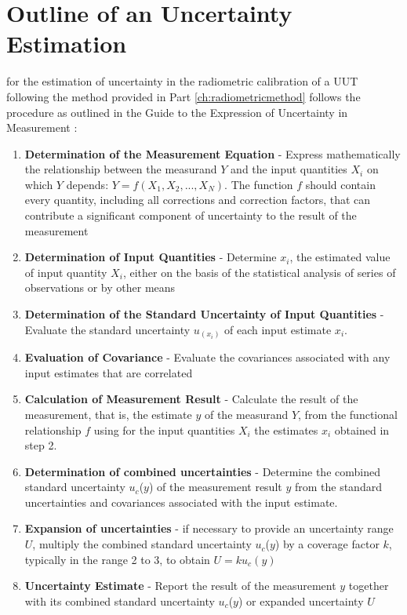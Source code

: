 \documentclass[nohyper,nobib]{tufte-book}
\begin{document}
\chapter{Outline of an Uncertainty Estimation}
\label{ch:outlineuncertain}

 for the estimation of uncertainty in the radiometric calibration of a UUT following the method provided in Part \ref{ch:radiometricmethod}  follows the procedure as outlined in the Guide to the Expression of Uncertainty in Measurement \cite{GUM2008}:

\begin{enumerate}
	\item \textbf{Determination of the Measurement Equation} - Express mathematically the relationship between the measurand $Y$ and the input quantities $X_{i}$ on which $Y$ depends: \( Y = f (X_{1}, X_{2}, ..., X_{N}) \). The function $f$ should contain every quantity, including all corrections and correction factors, that can contribute a significant component of uncertainty to the result of the
measurement 
	\item \textbf{Determination of Input Quantities} - Determine $x_{i}$, the estimated value of input quantity $X_{i}$, either on the basis of the statistical analysis of series of observations or by other means
	\item  \textbf{Determination of the Standard Uncertainty of Input Quantities} - Evaluate the standard uncertainty $u_{(x_{i})}$ of each input estimate $x_{i}$.
	\item \textbf{Evaluation of Covariance} - Evaluate the covariances associated with any input estimates that are correlated
	\item \textbf{Calculation of Measurement Result} - Calculate the result of the measurement, that is, the estimate $y$ of the measurand $Y$, from the functional
relationship $f$ using for the input quantities $X_{i}$ the estimates $x_{i}$ obtained in step 2.
	\item \textbf{Determination of combined uncertainties} - Determine the combined standard uncertainty $u_{c}$($y$) of the measurement result $y$ from the standard
uncertainties and covariances associated with the input estimate.
	\item \textbf{Expansion of uncertainties} - if necessary to provide an uncertainty range $U$, multiply the combined standard uncertainty $u_{c}$($y$) by a coverage factor $k$, typically in the range 2 to 3, to obtain \( U = k u_{c}(y) \)
	\item \textbf{Uncertainty Estimate} - Report the result of the measurement $y$ together with its combined standard uncertainty $u_{c}$($y$) or expanded uncertainty $U$
\end{enumerate}
\end{document}

